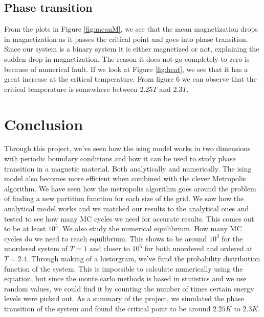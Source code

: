 \documentclass{article}
\begin{document}
\subsection{Phase transition}
From the plots in Figure \ref{fig:meanM}, we see that the mean magnetization drops in magnetization as it passes the critical point and goes into phase transition. Since our system is a binary system it is either magnetized or not, explaining the sudden drop in magnetization. The reason it does not go completely to zero is because of numerical fault. If we look at Figure \ref{fig:heat}, we see that it has a great increase at the critical temperature. From figure 6 we can observe that the critical temperature is somewhere between 2.25$T$ and 2.3$T$.

\section{Conclusion}
Through this project, we've seen how the ising model works in two dimensions with periodic boundary conditions and how it can be used to study phase transition in a magnetic material. Both analytically and numerically. The ising model also becomes more efficient when combined with the clever Metropolis algorithm. We have seen how the metropolis algorithm goes around the problem of finding a new partition function for each size of the grid. We saw how the analytical model works and we matched our results to the analytical ones and tested to see how many MC cycles we need for accurate results. This comes out to be at least $10^5$. We also study the numerical equilibrium. How many MC cycles do we need to reach equilibrium. This shows to be around $10^3$ for the unordered system of $T = 1$ and closer to $10^5$ for both unordered and ordered at $T = 2.4$. Through making of a historgram, we've fund the probability distribution function of the system. This is impossible to calculate numerically using the equation, but since the monte carlo methods is based in statistics and we use random values, we could find it by counting the number of times certain energy levels were picked out. As a summary of the project, we simulated the phase transition of the system and found the critical point to be around $2.25K$ to $2.3K$.

\printbibliography
\end{document}
